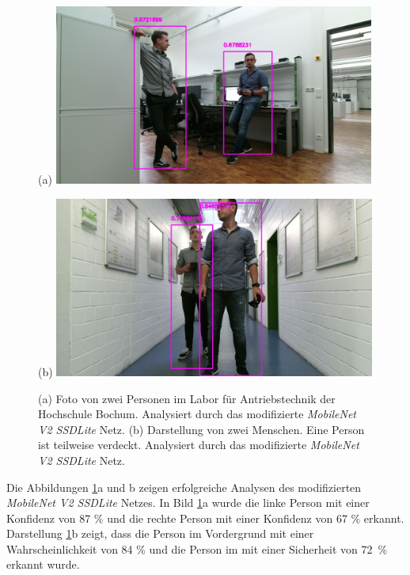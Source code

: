 	\begin{figure}[H]
	\centering
	\begin{minipage}[b]{0.49\textwidth}
		(a)
		\includegraphics[width=0.94\textwidth]{Bilder/26t.jpg}
	\end{minipage}
	\hfill
	\begin{minipage}[b]{0.49\textwidth}
		(b)
		\includegraphics[width=0.94\textwidth]{Bilder/39t.jpg}
	\end{minipage}
	\caption{(a) Foto von zwei Personen im Labor für Antriebstechnik der Hochschule Bochum. Analysiert durch das modifizierte \textit{MobileNet V2 SSDLite} Netz. (b) Darstellung von zwei Menschen. Eine Person ist teilweise verdeckt. Analysiert durch das modifizierte \textit{MobileNet V2 SSDLite} Netz.}
	\label{fig: owndatat}
\end{figure}



Die Abbildungen \ref{fig: owndatat}a und b zeigen erfolgreiche Analysen des modifizierten \textit{MobileNet V2 SSDLite} Netzes. In Bild \ref{fig: owndatat}a wurde die linke Person mit einer Konfidenz von 87 \% und die rechte Person mit einer Konfidenz von 67 \% erkannt. Darstellung \ref{fig: owndatat}b zeigt, dass die Person im Vordergrund mit einer Wahrscheinlichkeit von 84 \% und die Person im mit einer Sicherheit von {72~\%} erkannt wurde. \\


